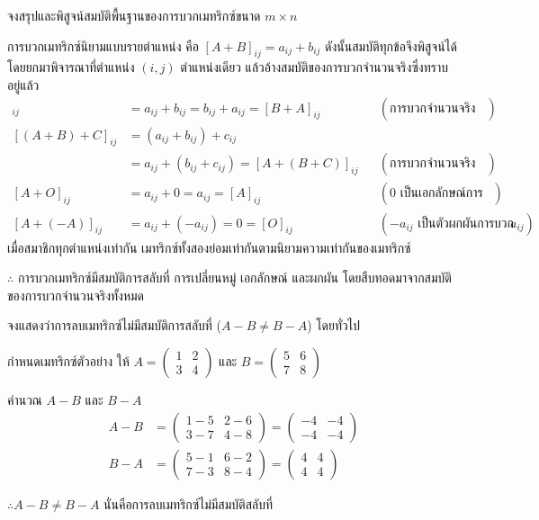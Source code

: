 \begin{ex}
\label{ex:add-properties}
จงสรุปและพิสูจน์สมบัติพื้นฐานของการบวกเมทริกซ์ขนาด $m \times n$
\end{ex}
\begin{solution}
การบวกเมทริกซ์นิยามแบบรายตำแหน่ง คือ $[A+B]_{ij} = a_{ij} + b_{ij}$ ดังนั้นสมบัติทุกข้อจึงพิสูจน์ได้โดยยกมาพิจารณาที่ตำแหน่ง $(i,j)$ ตำแหน่งเดียว แล้วอ้างสมบัติของการบวกจำนวนจริงซึ่งทราบอยู่แล้ว
\begin{align*}
[A+B]_{ij} &= a_{ij} + b_{ij} = b_{ij} + a_{ij} = [B+A]_{ij} && (\text{การบวกจำนวนจริงสลับที่ได้})\\
[(A+B)+C]_{ij} &= (a_{ij} + b_{ij}) + c_{ij}\\
                &= a_{ij} + (b_{ij} + c_{ij}) = [A+(B+C)]_{ij} && (\text{การบวกจำนวนจริงเปลี่ยนหมู่ได้})\\
[A+O]_{ij} &= a_{ij} + 0 = a_{ij} = [A]_{ij} && (0 \text{ เป็นเอกลักษณ์การบวก})\\
[A+(-A)]_{ij} &= a_{ij} + (-a_{ij}) = 0 = [O]_{ij} && (-a_{ij} \text{ เป็นตัวผกผันการบวกของ } a_{ij})
\end{align*}
เมื่อสมาชิกทุกตำแหน่งเท่ากัน เมทริกซ์ทั้งสองย่อมเท่ากันตามนิยามความเท่ากันของเมทริกซ์

$\therefore$ การบวกเมทริกซ์มีสมบัติการสลับที่ การเปลี่ยนหมู่ เอกลักษณ์ และผกผัน โดยสืบทอดมาจากสมบัติของการบวกจำนวนจริงทั้งหมด \solhere
\end{solution}

\begin{ex}
\label{ex:sub-not-commutative}
จงแสดงว่าการลบเมทริกซ์ไม่มีสมบัติการสลับที่ ($A - B \neq B - A$) โดยทั่วไป
\end{ex}
\begin{solution}
กำหนดเมทริกซ์ตัวอย่าง ให้ $A = \begin{pmatrix} 1 & 2 \\ 3 & 4 \end{pmatrix}$ และ $B = \begin{pmatrix} 5 & 6 \\ 7 & 8 \end{pmatrix}$

คำนวณ $A - B$ และ $B - A$ \begin{align*}
    A - B &= \begin{pmatrix} 1-5 & 2-6 \\ 3-7 & 4-8 \end{pmatrix} = \begin{pmatrix} -4 & -4 \\ -4 & -4 \end{pmatrix}\\
    B - A &= \begin{pmatrix} 5-1 & 6-2 \\ 7-3 & 8-4 \end{pmatrix} = \begin{pmatrix} 4 & 4 \\ 4 & 4 \end{pmatrix}
    \end{align*}

$\therefore A - B \neq B - A$ นั่นคือการลบเมทริกซ์ไม่มีสมบัติสลับที่ \solhere
\end{solution}

